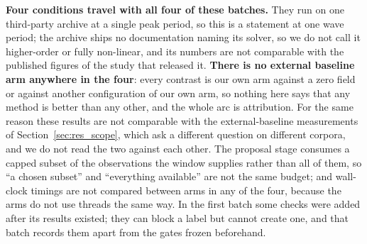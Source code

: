 \documentclass[review]{elsarticle}
\begin{document}
\textbf{Four conditions travel with all four of these batches.} They run on one
third-party archive at a single peak period, so this is a statement at one wave
period; the archive ships no documentation naming its solver, so we do not call it
higher-order or fully non-linear, and its numbers are not comparable with the
published figures of the study that released it. \textbf{There is no external
baseline arm anywhere in the four}: every contrast is our own arm against a zero
field or against another configuration of our own arm, so nothing here says that any
method is better than any other, and the whole arc is attribution. For the same
reason these results are not comparable with the external-baseline measurements of
Section~\ref{sec:res_scope}, which ask a different question on different corpora, and
we do not read the two against each other. The proposal stage consumes a capped
subset of the observations the window supplies rather than all of them, so ``a chosen
subset'' and ``everything available'' are not the same budget; and wall-clock timings
are not compared between arms in any of the four, because the arms do not use threads
the same way. In the first batch some checks were added after its results existed;
they can block a label but cannot create one, and that batch records them apart from
the gates frozen beforehand.

\end{document}
